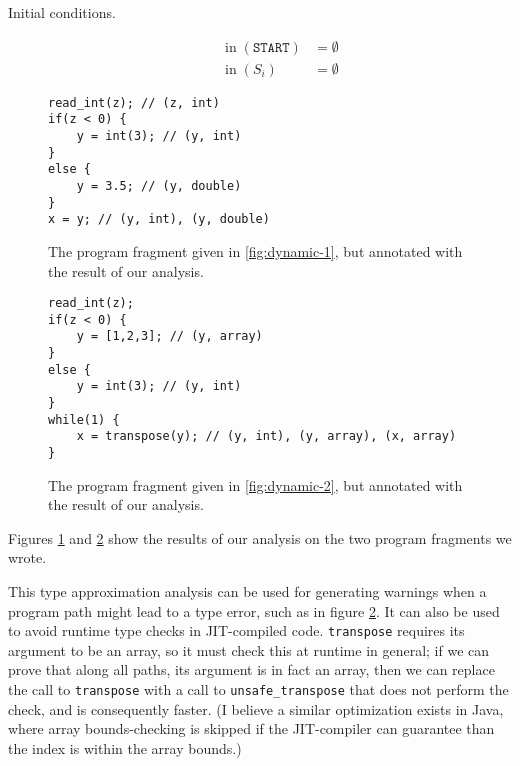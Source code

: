 \documentclass[11pt,letterpaper]{article}
\DeclareMathOperator{\inputOp}{in}
\newcommand{\In}[1]{\inputOp{(#1)}}
\begin{document}
\begin{description}
    \item[Initial conditions.]
        \begin{align*}
            \In{\mathtt{START}} &= \emptyset \\
            \In{S_i} &= \emptyset
        \end{align*}
\end{description}

\begin{figure}[ht]
    \centering
    \begin{lstlisting}
read_int(z); // (z, int)
if(z < 0) {
    y = int(3); // (y, int)
}
else {
    y = 3.5; // (y, double)
}
x = y; // (y, int), (y, double)
    \end{lstlisting}

    \caption{
        The program fragment given in \ref{fig:dynamic-1}, but annotated with
        the result of our analysis.
    }
    \label{fig:ann-dynamic-1}
\end{figure}

\begin{figure}[ht]
    \centering
    \begin{lstlisting}
read_int(z);
if(z < 0) {
    y = [1,2,3]; // (y, array)
}
else {
    y = int(3); // (y, int)
}
while(1) {
    x = transpose(y); // (y, int), (y, array), (x, array)
}
    \end{lstlisting}

    \caption{
        The program fragment given in \ref{fig:dynamic-2}, but annotated with
        the result of our analysis.
    }
    \label{fig:ann-dynamic-2}
\end{figure}

Figures \ref{fig:ann-dynamic-1} and \ref{fig:ann-dynamic-2} show the results of
our analysis on the two program fragments we wrote.

This type approximation analysis can be used for generating warnings when a
program path might lead to a type error, such as in figure
\ref{fig:ann-dynamic-2}. It can also be used to avoid runtime type checks in
JIT-compiled code. \texttt{transpose} requires its argument to be an array, so
it must check this at runtime in general; if we can prove that along all paths,
its argument is in fact an array, then we can replace the call to
\texttt{transpose} with a call to \texttt{unsafe_transpose} that does not
perform the check, and is consequently faster. (I believe a similar
optimization exists in Java, where array bounds-checking is skipped if the
JIT-compiler can guarantee than the index is within the array bounds.)
\end{document}
